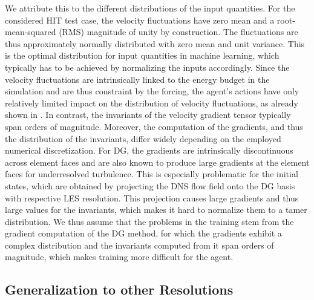 We attribute this to the different distributions of the input quantities.
For the considered HIT test case, the velocity fluctuations have zero mean and a root-mean-squared (RMS) magnitude of unity by construction.
The fluctuations are thus approximately normally distributed with zero mean and unit variance.
This is the optimal distribution for input quantities in machine learning, which typically has to be achieved by normalizing the inputs accordingly.
Since the velocity fluctuations are intrinsically linked to the energy budget in the simulation and are thus constraint by the forcing, the agent's actions have only relatively limited impact on the distribution of velocity fluctuations, as already shown in .
In contrast, the invariants of the velocity gradient tensor typically span orders of magnitude.
Moreover, the computation of the gradients, and thus the distribution of the invariants, differ widely depending on the employed numerical discretization.
For DG, the gradients are intrinsically discontinuous across element faces and are also known to produce large gradients at the element faces for underresolved turbulence.
This is especially problematic for the initial states, which are obtained by projecting the DNS flow field onto the DG basis with respective LES resolution.
This projection causes large gradients and thus large values for the invariants, which makes it hard to normalize them to a tamer distribution.
We thus assume that the problems in the training stem from the gradient computation of the DG method, for which the gradients exhibit a complex distribution and the invariants computed from it span orders of magnitude, which makes training more difficult for the agent.


\subsection{Generalization to other Resolutions}
\label{sec:results_generalize}

